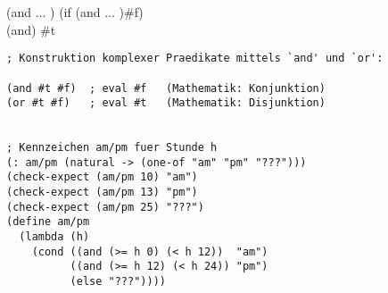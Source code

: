 (and   $\ldots$ ) \eval (if  (and  $\ldots$ )\#f)\\
(and) \eval \#t
\begin{lstlisting}[frame=single]          
; Konstruktion komplexer Praedikate mittels `and' und `or':

(and #t #f)  ; eval #f   (Mathematik: Konjunktion)
(or #t #f)   ; eval #t   (Mathematik: Disjunktion)


; Kennzeichen am/pm fuer Stunde h
(: am/pm (natural -> (one-of "am" "pm" "???")))
(check-expect (am/pm 10) "am")
(check-expect (am/pm 13) "pm")
(check-expect (am/pm 25) "???")
(define am/pm
  (lambda (h)
    (cond ((and (>= h 0) (< h 12))  "am")
          ((and (>= h 12) (< h 24)) "pm")
          (else "???"))))
\end{lstlisting}